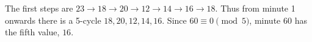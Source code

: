 The first steps are $23\to18\to20\to12\to14\to16\to18$. Thus from minute 1 onwards there is a 5-cycle $18,20,12,14,16$. Since $60\equiv0\pmod5$, minute 60 has the fifth value, $\boxed{16}$.
